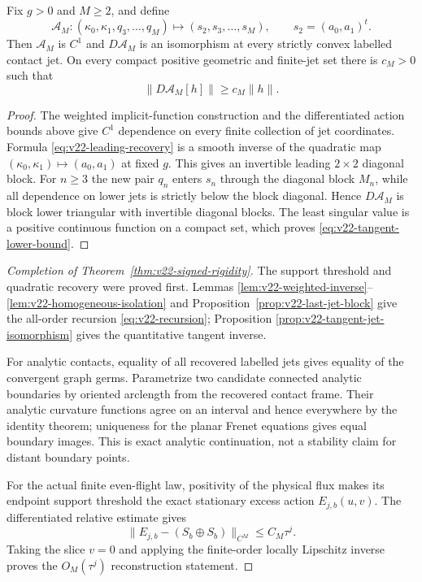\begin{proposition}
\label{prop:v22-tangent-jet-isomorphism}
Fix $g>0$ and $M\ge2$, and define
\[
 \mathscr A_M:
 (\kappa_0,\kappa_1,q_3,\ldots,q_M)
 \longmapsto(s_2,s_3,\ldots,s_M),
 \qquad s_2=(a_0,a_1)^t.
\]
Then $\mathscr A_M$ is $C^1$ and $D\mathscr A_M$ is an isomorphism at every
strictly convex labelled contact jet.  On every compact positive geometric
and finite-jet set there is $c_M>0$ such that
\begin{equation}\label{eq:v22-tangent-lower-bound}
                    \|D\mathscr A_M[h]\|\ge c_M\|h\|.
\end{equation}
\end{proposition}

\begin{proof}
The weighted implicit-function construction and the differentiated action
bounds above give $C^1$ dependence on every finite collection of jet
coordinates.  Formula \eqref{eq:v22-leading-recovery} is a smooth inverse of
the quadratic map
$(\kappa_0,\kappa_1)\mapsto(a_0,a_1)$ at fixed $g$.  This gives an invertible
leading $2\times2$ diagonal block.  For $n\ge3$ the new pair $q_n$ enters
$s_n$ through the diagonal block $M_n$, while all dependence on lower jets is
strictly below the block diagonal.  Hence $D\mathscr A_M$ is block lower
triangular with invertible diagonal blocks.  The least singular value is a
positive continuous function on a compact set, which proves
\eqref{eq:v22-tangent-lower-bound}.
\end{proof}

\begin{proof}[Completion of Theorem~\ref{thm:v22-signed-rigidity}]
The support threshold and quadratic recovery were proved first.  Lemmas
\ref{lem:v22-weighted-inverse}--\ref{lem:v22-homogeneous-isolation} and
Proposition~\ref{prop:v22-last-jet-block} give the all-order recursion
\eqref{eq:v22-recursion}; Proposition
\ref{prop:v22-tangent-jet-isomorphism} gives the quantitative tangent inverse.

For analytic contacts, equality of all recovered labelled jets gives equality
of the convergent graph germs.  Parametrize two candidate connected analytic
boundaries by oriented arclength from the recovered contact frame.  Their
analytic curvature functions agree on an interval and hence everywhere by
the identity theorem; uniqueness for the planar Frenet equations gives equal
boundary images.  This is exact analytic continuation, not a stability claim
for distant boundary points.

For the actual finite even-flight law, positivity of the physical flux makes
its endpoint support threshold the exact stationary excess action
$E_{j,b}(u,v)$.  The differentiated relative estimate gives
\[
 \|E_{j,b}-(S_b\oplus S_b)\|_{C^M}\le C_M\tau^j.
\]
Taking the slice $v=0$ and applying the finite-order locally Lipschitz inverse
proves the $O_M(\tau^j)$ reconstruction statement.
\end{proof}

